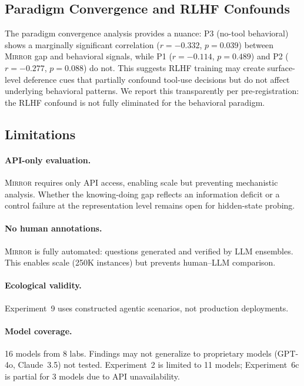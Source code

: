 \documentclass[10pt]{article}
\newcommand{\mirror}{\textsc{Mirror}}
\begin{document}
\subsection{Paradigm Convergence and RLHF Confounds}

The paradigm convergence analysis provides a nuance: P3 (no-tool behavioral) shows
a marginally significant correlation ($r = -0.332$, $p = 0.039$) between \mirror{}
gap and behavioral signals, while P1 ($r = -0.114$, $p = 0.489$) and P2
($r = -0.277$, $p = 0.088$) do not. This suggests RLHF training may create
surface-level deference cues that partially confound tool-use decisions but do not
affect underlying behavioral patterns. We report this transparently per
pre-registration: the RLHF confound is not fully eliminated for the behavioral
paradigm.

\subsection{Limitations}

\paragraph{API-only evaluation.}
\mirror{} requires only API access, enabling scale but preventing mechanistic
analysis. Whether the knowing-doing gap reflects an information deficit or a
control failure at the representation level remains open for hidden-state probing.

\paragraph{No human annotations.}
\mirror{} is fully automated: questions generated and verified by LLM ensembles.
This enables scale (250K instances) but prevents human--LLM comparison.

\paragraph{Ecological validity.}
Experiment~9 uses constructed agentic scenarios, not production deployments.

\paragraph{Model coverage.}
16 models from 8 labs. Findings may not generalize to proprietary models (GPT-4o,
Claude~3.5) not tested. Experiment~2 is limited to 11 models; Experiment~6c is
partial for 3 models due to API unavailability.
\end{document}
